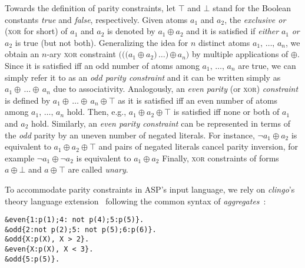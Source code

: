 \documentclass{svproc}
\newcommand{\XOR}{\textsc{xor}} %
\newcommand{\sysfont}{\textit}
\newcommand{\clingo}{\sysfont{clingo}}
\newcommand{\rg}[3]{{#1}{#2}\,\ldots{#2}\,{#3}}
\newcommand{\xor}{\oplus}
\newcommand{\true}{\top}
\newcommand{\false}{\bot}
\begin{document}
Towards the definition of parity constraints, let $\true$ and $\false$
stand for the Boolean constants \emph{true} and \emph{false},
respectively. %
%
Given atoms $a_1$ and $a_2$, the \emph{exclusive or}
(\XOR{} for short) of $a_1$ and $a_2$ is denoted by $a_1\xor a_2$ and
it is satisfied if \emph{either} $a_1$ \emph{or} $a_2$ is true (but
not both).
Generalizing the idea for $n$ distinct atoms
$\rg{a_1}{,}{a_n}$, we obtain an $n$-ary \XOR{} constraint
$\rg{(((a_1\xor a_2}{)}{\xor\,a_n)}$ by multiple applications of
$\xor$. Since it is satisfied iff an odd number of atoms among
$\rg{a_1}{,}{a_n}$ are true,
we can simply refer it to as an \emph{odd parity constraint}
and it can be written simply as
$\rg{a_1}{\xor}{a_n}$ due to associativity.
%
Analogously, an \emph{even parity} (or \XOR{}) \emph{constraint} is defined by
$\rg{a_1}{\xor}{a_n}\xor\true$ as it is satisfied iff an even number
of atoms among $\rg{a_1}{,}{a_n}$ hold. Then, e.g.,
%
$a_1\xor a_2\xor\true$
%
is satisfied iff none or both of $a_1$ and $a_2$ hold.
%
Similarly, an \emph{even parity constraint} can be represented in terms of the \emph{odd} parity by an uneven
number of negated literals.
For instance, $\neg a_1\xor a_2$ is equivalent to $a_1\xor a_2\xor\true$ and pairs of negated literals cancel parity inversion, for example $\neg a_1\xor \neg a_2$ is equivalent to $a_1\xor a_2$
Finally, \XOR{} constraints of forms $a\xor\false$ and $a\xor\true$
are called \emph{unary}.

To accommodate parity constraints in ASP's input language,
we rely on \clingo’s theory language extension~\cite{DBLP:conf/iclp/GebserKKOSW16}
following the common syntax of \emph{aggregates}~\cite{DBLP:journals/tplp/GebserHKLS15}:

\begin{verbatim}
&even{1:p(1);4: not p(4);5:p(5)}.
&odd{2:not p(2);5: not p(5);6:p(6)}.
&odd{X:p(X), X > 2}.
&even{X:p(X), X < 3}.
&odd{5:p(5)}.
\end{verbatim}
\end{document}
